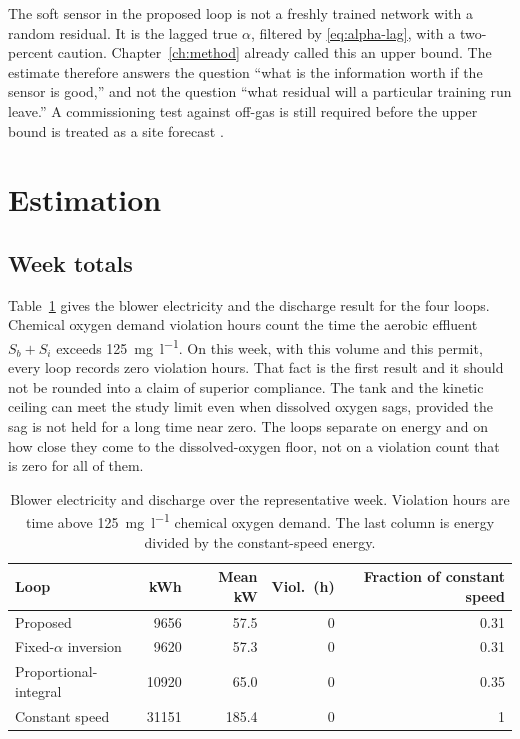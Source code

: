 The soft sensor in the proposed loop is not a freshly trained network with a random residual. It is the lagged true $\alpha$, filtered by \eqref{eq:alpha-lag}, with a two-percent caution. Chapter~\ref{ch:method} already called this an upper bound. The estimate therefore answers the question ``what is the information worth if the sensor is good,'' and not the question ``what residual will a particular training run leave.'' A commissioning test against off-gas is still required before the upper bound is treated as a site forecast \cite{leu2009,redmon1983}.

\section{Estimation}
\label{sec:est}

\subsection{Week totals}

Table~\ref{tab:week} gives the blower electricity and the discharge result for the four loops. Chemical oxygen demand violation hours count the time the aerobic effluent $S_{b}+S_{i}$ exceeds \SI{125}{\milli\gram\per\litre}. On this week, with this volume and this permit, every loop records zero violation hours. That fact is the first result and it should not be rounded into a claim of superior compliance. The tank and the kinetic ceiling can meet the study limit even when dissolved oxygen sags, provided the sag is not held for a long time near zero. The loops separate on energy and on how close they come to the dissolved-oxygen floor, not on a violation count that is zero for all of them.

\begin{table}[ht]
\centering
\caption{Blower electricity and discharge over the representative week. Violation hours are time above \SI{125}{\milli\gram\per\litre} chemical oxygen demand. The last column is energy divided by the constant-speed energy.}
\label{tab:week}
\small
\begin{tabular}{@{}lrrrr@{}}
\toprule
Loop & kWh & Mean kW & Viol.\ (h) & Fraction of constant speed \\
\midrule
Proposed & 9656 & 57.5 & 0 & 0.31 \\
Fixed-$\alpha$ inversion & 9620 & 57.3 & 0 & 0.31 \\
Proportional-integral & 10920 & 65.0 & 0 & 0.35 \\
Constant speed & 31151 & 185.4 & 0 & 1 \\
\bottomrule
\end{tabular}
\end{table}

